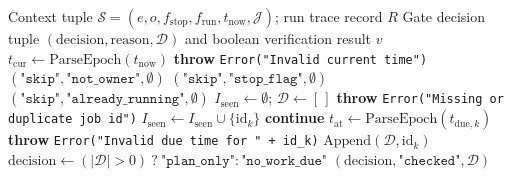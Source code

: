 \begin{algorithm}[htbp]
\caption{Deterministic Sole-Operator \& Temporal Scheduling Gate (\texttt{planRun} \& \texttt{verifyScheduledRun})}
\label{alg:planrun}
\footnotesize
\begin{algorithmic}[1]
\Require Context tuple $\mathcal{S} = (e, o, f_{\text{stop}}, f_{\text{run}}, t_{\text{now}}, \mathcal{J})$; run trace record $R$
\Ensure Gate decision tuple $(\text{decision}, \text{reason}, \mathcal{D})$ and boolean verification result $v$
\State $t_{\text{cur}} \gets \text{ParseEpoch}(t_{\text{now}})$
 \textbf{throw} \texttt{Error("Invalid current time")} \EndIf
{} \Return $(\texttt{"skip"}, \texttt{"not\_owner"}, \emptyset)$ \EndIf
{} \Return $(\texttt{"skip"}, \texttt{"stop\_flag"}, \emptyset)$ \EndIf
{} \Return $(\texttt{"skip"}, \texttt{"already\_running"}, \emptyset)$ \EndIf
\State $I_{\text{seen}} \gets \emptyset$; $\mathcal{D} \gets [\,]$
     \textbf{throw} \texttt{Error("Missing or duplicate job id")} \EndIf
    \State $I_{\text{seen}} \gets I_{\text{seen}} \cup \{\text{id}_k\}$
     \textbf{continue} \EndIf
    \State $t_{\text{at}} \gets \text{ParseEpoch}(t_{\text{due},k})$
     \textbf{throw} \texttt{Error("Invalid due time for " + id\_k)} \EndIf
     $\text{Append}(\mathcal{D}, \text{id}_k)$ \EndIf
\EndFor
\State $\text{decision} \gets (|\mathcal{D}| > 0)\ ?\ \texttt{"plan\_only"} : \texttt{"no\_work\_due"}$
\State \Return $(\text{decision}, \texttt{"checked"}, \mathcal{D})$
\end{algorithmic}
\end{algorithm}
